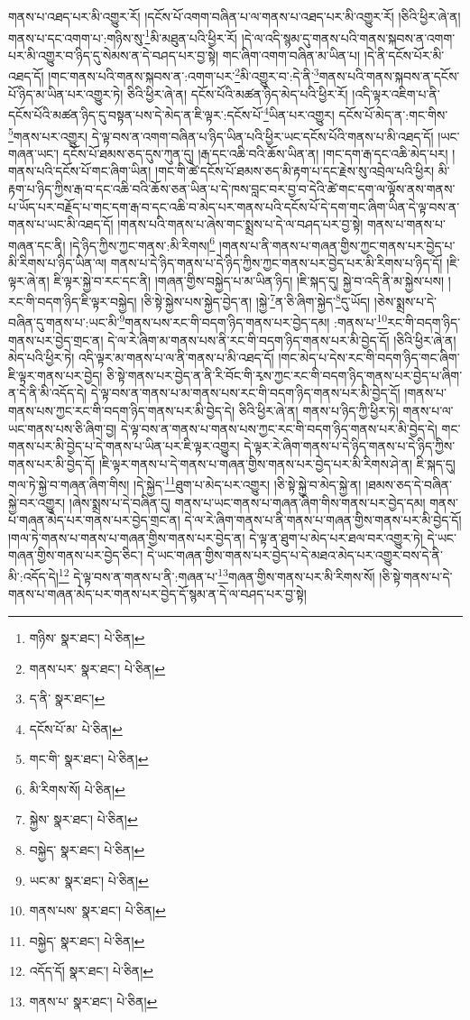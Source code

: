 གནས་པ་འཐད་པར་མི་འགྱུར་རོ། །དངོས་པོ་འགག་བཞིན་པ་ལ་གནས་པ་འཐད་པར་མི་འགྱུར་རོ། །ཅིའི་ཕྱིར་ཞེ་ན། གནས་པ་དང་འགག་པ་:གཉིས་སུ་\footnote{གཉིས་  སྣར་ཐང་།  པེ་ཅིན། }མི་མཐུན་པའི་ཕྱིར་རོ། །དེ་ལ་འདི་སྙམ་དུ་གནས་པའི་གནས་སྐབས་ན་འགག་པར་མི་འགྱུར་བ་ཉིད་དུ་སེམས་ན་དེ་བཤད་པར་བྱ་སྟེ། གང་ཞིག་འགག་བཞིན་མ་ཡིན་པ། །དེ་ནི་དངོས་པོར་མི་འཐད་དོ། །གང་གནས་པའི་གནས་སྐབས་ན་:འགག་པར་\footnote{གནས་པར་  སྣར་ཐང་།  པེ་ཅིན། }མི་འགྱུར་བ་:དེ་ནི་\footnote{ད་ནི་  སྣར་ཐང་། }གནས་པའི་གནས་སྐབས་ན་དངོས་པོ་ཉིད་མ་ཡིན་པར་འགྱུར་ཏེ། ཅིའི་ཕྱིར་ཞེ་ན། དངོས་པོའི་མཚན་ཉིད་མེད་པའི་ཕྱིར་རོ། །འདི་ལྟར་འཇིག་པ་ནི་དངོས་པོའི་མཚན་ཉིད་དུ་བསྟན་པས་དེ་མེད་ན་ཇི་ལྟར་:དངོས་པོ་\footnote{དངོས་པོ་མ་  པེ་ཅིན། }ཡིན་པར་འགྱུར། དངོས་པོ་མེད་ན་:གང་གིས་\footnote{གང་གི་  སྣར་ཐང་།  པེ་ཅིན། }གནས་པར་འགྱུར། དེ་ལྟ་བས་ན་འགག་བཞིན་པ་ཉིད་ཡིན་པའི་ཕྱིར་ཡང་དངོས་པོའི་གནས་པ་མི་འཐད་དོ། །ཡང་གཞན་ཡང་། དངོས་པོ་ཐམས་ཅད་དུས་ཀུན་དུ། །རྒ་དང་འཆི་བའི་ཆོས་ཡིན་ན། །གང་དག་རྒ་དང་འཆི་མེད་པར། །གནས་པའི་དངོས་པོ་གང་ཞིག་ཡིན། །གང་གི་ཚེ་དངོས་པོ་ཐམས་ཅད་མི་རྟག་པ་དང་རྗེས་སུ་འབྲེལ་པའི་ཕྱིར། མི་རྟག་པ་ཉིད་ཀྱིས་རྒ་བ་དང་འཆི་བའི་ཆོས་ཅན་ཡིན་པ་དེ་ཁས་བླང་བར་བྱ་བ་དེའི་ཚེ་གང་དག་ལ་ལྟོས་ནས་གནས་པ་ཡོད་པར་བརྗོད་པ་གང་དག་རྒ་བ་དང་འཆི་བ་མེད་པར་གནས་པའི་དངོས་པོ་དེ་དག་གང་ཞིག་ཡིན་དེ་ལྟ་བས་ན་གནས་པ་ཡང་མི་འཐད་དོ། །གནས་པའི་གནས་པ་ཞེས་གང་སྨྲས་པ་དེ་ལ་བཤད་པར་བྱ་སྟེ། གནས་པ་གནས་པ་གཞན་དང་ནི། །དེ་ཉིད་ཀྱིས་ཀྱང་གནས་:མི་རིགས།\footnote{མི་རིགས་སོ།  པེ་ཅིན། } །གནས་པ་ནི་གནས་པ་གཞན་གྱིས་ཀྱང་གནས་པར་བྱེད་པ་མི་རིགས་པ་ཉིད་ཡིན་ལ། གནས་པ་དེ་ཉིད་གནས་པ་དེ་ཉིད་ཀྱིས་ཀྱང་གནས་པར་བྱེད་པར་མི་རིགས་པ་ཉིད་དོ། །ཇི་ལྟར་ཞེ་ན། ཇི་ལྟར་སྐྱེ་བ་རང་དང་ནི། །གཞན་གྱིས་བསྐྱེད་པ་མ་ཡིན་ཉིད། །ཇི་སྐད་དུ། སྐྱེ་བ་འདི་ནི་མ་སྐྱེས་པས། །རང་གི་བདག་ཉིད་ཇི་ལྟར་བསྐྱེད། །ཅི་སྟེ་སྐྱེས་པས་སྐྱེད་བྱེད་ན། །སྐྱེ་\footnote{སྐྱེས་  སྣར་ཐང་།  པེ་ཅིན། }ན་ཅི་ཞིག་སྐྱེད་\footnote{བསྐྱེད་  སྣར་ཐང་།  པེ་ཅིན། }དུ་ཡོད། །ཅེས་སྨྲས་པ་དེ་བཞིན་དུ་གནས་པ་:ཡང་མི་\footnote{ཡང་མ་  སྣར་ཐང་།  པེ་ཅིན། }གནས་པས་རང་གི་བདག་ཉིད་གནས་པར་བྱེད་དམ། :གནས་པ་\footnote{གནས་པས་  སྣར་ཐང་།  པེ་ཅིན། }རང་གི་བདག་ཉིད་གནས་པར་བྱེད་གྲང་ན། དེ་ལ་རེ་ཞིག་མ་གནས་པས་ནི་རང་གི་བདག་ཉིད་གནས་པར་མི་བྱེད་དོ། །ཅིའི་ཕྱིར་ཞེ་ན། མེད་པའི་ཕྱིར་ཏེ། འདི་ལྟར་མ་གནས་པ་ལ་ནི་གནས་པ་མི་འཐད་དོ། །གང་མེད་པ་དེས་རང་གི་བདག་ཉིད་གང་ཞིག་ཇི་ལྟར་གནས་པར་བྱེད། ཅི་སྟེ་གནས་པར་བྱེད་ན་ནི་རི་བོང་གི་རྭས་ཀྱང་རང་གི་བདག་ཉིད་གནས་པར་བྱེད་པ་ཞིག་ན་དེ་ནི་མི་འདོད་དེ། དེ་ལྟ་བས་ན་གནས་པ་མ་གནས་པས་རང་གི་བདག་ཉིད་གནས་པར་མི་བྱེད་དོ། །གནས་པ་གནས་པས་ཀྱང་རང་གི་བདག་ཉིད་གནས་པར་མི་བྱེད་དེ། ཅིའི་ཕྱིར་ཞེ་ན། གནས་པ་ཉིད་ཀྱི་ཕྱིར་ཏེ། གནས་པ་ལ་ཡང་གནས་པས་ཅི་ཞིག་བྱ། དེ་ལྟ་བས་ན་གནས་པ་གནས་པས་ཀྱང་རང་གི་བདག་ཉིད་གནས་པར་མི་བྱེད་དེ། གང་གནས་པར་མི་བྱེད་པ་དེ་གནས་པ་ཡིན་པར་ཇི་ལྟར་འགྱུར། དེ་ལྟར་རེ་ཞིག་གནས་པ་དེ་ཉིད་གནས་པ་དེ་ཉིད་ཀྱིས་གནས་པར་མི་བྱེད་དོ། །ཇི་ལྟར་གནས་པ་དེ་གནས་པ་གཞན་གྱིས་གནས་པར་བྱེད་པར་མི་རིགས་ཤེ་ན། ཇི་སྐད་དུ། གལ་ཏེ་སྐྱེ་བ་གཞན་ཞིག་གིས། །དེ་སྐྱེད་\footnote{བསྐྱེད་  སྣར་ཐང་།  པེ་ཅིན། }ཐུག་པ་མེད་པར་འགྱུར། །ཅི་སྟེ་སྐྱེ་བ་མེད་སྐྱེ་ན། །ཐམས་ཅད་དེ་བཞིན་སྐྱེ་བར་འགྱུར། །ཞེས་སྨྲས་པ་དེ་བཞིན་དུ། གནས་པ་ཡང་གནས་པ་གཞན་ཞིག་གིས་གནས་པར་བྱེད་དམ། གནས་པ་གཞན་མེད་པར་གནས་པར་བྱེད་གྲང་ན། དེ་ལ་རེ་ཞིག་གནས་པ་ནི་གནས་པ་གཞན་གྱིས་གནས་པར་མི་བྱེད་དོ། །གལ་ཏེ་གནས་པ་གནས་པ་གཞན་གྱིས་གནས་པར་བྱེད་ན། དེ་ལྟ་ན་ཐུག་པ་མེད་པར་ཐལ་བར་འགྱུར་ཏེ། དེ་ཡང་གཞན་གྱིས་གནས་པར་བྱེད་ཅིང་། དེ་ཡང་གཞན་གྱིས་གནས་པར་བྱེད་པ་དེ་མཐའ་མེད་པར་འགྱུར་བས་དེ་ནི་མི་:འདོད་དེ།\footnote{འདོད་དོ།  སྣར་ཐང་།  པེ་ཅིན། } དེ་ལྟ་བས་ན་གནས་པ་ནི་:གཞན་པ་\footnote{གནས་པ་  སྣར་ཐང་།  པེ་ཅིན། }གཞན་གྱིས་གནས་པར་མི་རིགས་སོ། །ཅི་སྟེ་གནས་པ་དེ་གནས་པ་གཞན་མེད་པར་གནས་པར་བྱེད་དོ་སྙམ་ན་དེ་ལ་བཤད་པར་བྱ་སྟེ། 